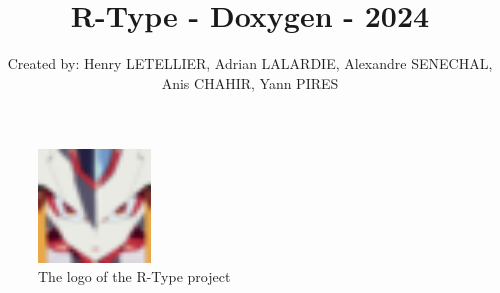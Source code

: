 \documentclass{article}
\title{R-Type - Doxygen - 2024}
\author{Created by: Henry LETELLIER, Adrian LALARDIE, Alexandre SENECHAL, Anis CHAHIR, Yann PIRES}
\date{} %
\begin{document}
\maketitle

\begin{figure}[h]
    \centering
    \includegraphics[width=3cm]{./files/icon/favicon.png}
    \caption*{The logo of the R-Type project}
\end{figure}
\end{document}
